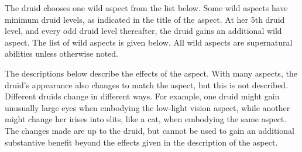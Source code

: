 The druid chooses one wild aspect from the list below.
Some wild aspects have minimum druid levels, as indicated in the title of the aspect.
At her 5th druid level, and every odd druid level thereafter, the druid gains an additional wild aspect.
The list of wild aspects is given below.
All wild aspects are supernatural abilities unless otherwise noted.

The descriptions below describe the effects of the aspect.
With many aspects, the druid's appearance also changes to match the aspect, but this is not described.
Different druids change in different ways.
For example, one druid might gain unusually large eyes when embodying the low-light vision aspect, while another might change her irises into slits, like a cat, when embodying the same aspect.
The changes made are up to the druid, but cannot be used to gain an additional substantive benefit beyond the effects given in the description of the aspect.

